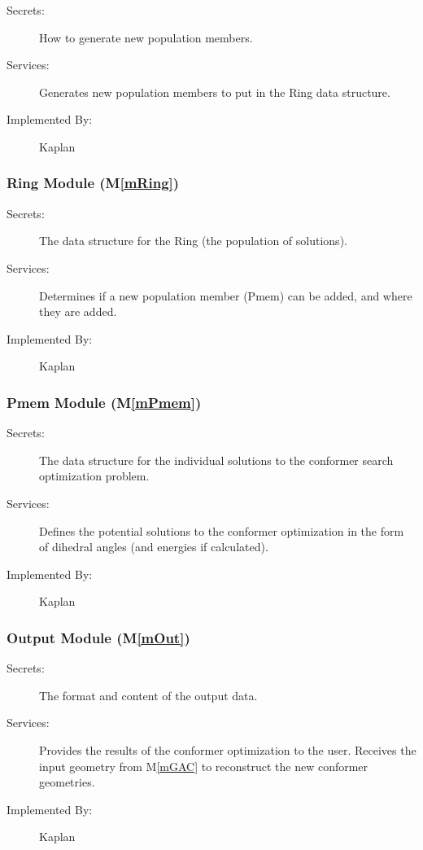 \documentclass[12pt, titlepage]{article}
\newcommand{\mref}[1]{M\ref{#1}}
\newcommand{\progname}{Kaplan} %
\begin{document}
\begin{description}
	\item[Secrets:] How to generate new population members.
	\item[Services:] Generates new population members to put in the Ring data 
	structure.
	\item[Implemented By:] \progname{}
\end{description}

\subsubsection{Ring Module (\mref{mRing})}

\begin{description}
	\item[Secrets:] The data structure for the Ring (the population of 
	solutions).
	\item[Services:] Determines if a new population member (Pmem) can be added, 
	and where they are added.
	\item[Implemented By:] \progname{}
\end{description}


\subsubsection{Pmem Module (\mref{mPmem})}

\begin{description}
	\item[Secrets:] The data structure for the individual solutions to the 
	conformer search optimization problem.
	\item[Services:] Defines the potential solutions to the conformer 
	optimization in the form of dihedral angles (and energies if calculated). 
	\item[Implemented By:] \progname{}
\end{description}

\subsubsection{Output Module (\mref{mOut})}

\begin{description}
	\item[Secrets:] The format and content of the output data.
	\item[Services:] Provides the results of the conformer optimization to the 
	user. Receives the input geometry from \mref{mGAC} to reconstruct the new 
	conformer geometries. 
	\item[Implemented By:] \progname{}
\end{description}
\end{document}
